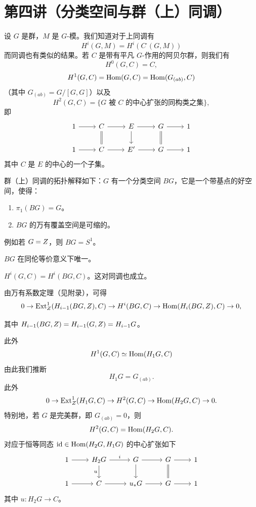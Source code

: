 \section{第四讲（分类空间与群（上）同调）}

设 $G$ 是群，$M$ 是 $G$-模。我们知道对于上同调有
\[
  H^i(G,M) = H^i(C^{\cdot}(G,M))
\]
而同调也有类似的结果。若 $C$ 是带有平凡 $G$-作用的阿贝尔群，则我们有
\[
  H^0(G,C) = C,
\]
\[
  H^1(G,C) = \operatorname{Hom}(G,C) = \operatorname{Hom}(G_{(ab)},C)
\]
（其中 $G_{(ab)} = G/[G,G]$）以及
\[
  H^2(G,C) = \{\text{$G$ 被 $C$ 的中心扩张的同构类之集}\},
\]
即
\[
  \begin{tikzcd}
    1 \arrow[r] & C \arrow[r] \arrow[d, equal] & E \arrow[r] \arrow[d] & G \arrow[r] \arrow[d, equal] & 1 \\
    1 \arrow[r] & C \arrow[r] & E' \arrow[r] & G \arrow[r] & 1
  \end{tikzcd}
\]
其中 $C$ 是 $E$ 的中心的一个子集。

群（上）同调的拓扑解释如下：$G$ 有一个分类空间 $BG$，它是一个带基点的好空间，使得：
\begin{enumerate}[label=\arabic*.]
\item $\pi_1(BG) = G$。
\item $BG$ 的万有覆盖空间是可缩的。
\end{enumerate}

例如若 $G=Z$，则 $BG=S^1$。

$BG$ 在同伦等价意义下唯一。

 $H^i(G,C) = H^i(BG,C)$。这对同调也成立。

由万有系数定理（见附录），可得
\[
  0 \to \operatorname{Ext}^1_{Z}(H_{i-1}(BG,Z),C) \to H^i(BG,C) \to \operatorname{Hom}(H_i(BG,Z),C) \to 0,
\]

其中 $H_{i-1}(BG,Z) = H_{i-1}(G,Z) = H_{i-1}G$。

此外
\[
  H^1(G,C) \simeq \operatorname{Hom}(H_1G,C)
\]
由此我们推断
\[
  H_1G = G_{(ab)}.
\]
此外
\[
  0 \to \operatorname{Ext}^1_{Z}(H_1G,C) \to H^2(G,C) \to \operatorname{Hom}(H_2G,C) \to 0.
\]
特别地，若 $G$ 是完美群，即 $G_{(ab)}=0$，则
\[
  H^2(G,C) = \operatorname{Hom}(H_2G,C).
\]
对应于恒等同态 $\mathrm{id}\in\operatorname{Hom}(H_2G,H_1G)$ 的中心扩张如下
\[
  \begin{tikzcd}
    1 \arrow[r] & H_2G \arrow[r, "i"] \arrow[d, "u"'] & \wt G \arrow[r] \arrow[d] & G \arrow[r] \arrow[d, equal] & 1 \\
    1 \arrow[r] & C \arrow[r] & u_*\wt G \arrow[r] & G \arrow[r] & 1
  \end{tikzcd}
\]
其中 $u : H_2G \to C$。

